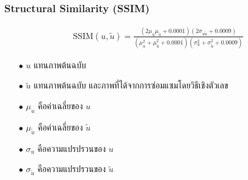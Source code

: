 \documentclass[xcolor=dvipsnames, xetex,serif]{beamer}
\numberwithin{equation}{section}
\begin{document}
    \begin{frame}
        \frametitle{Structural Similarity (SSIM)}
        \begin{align*}
        \text{SSIM}(u,\tilde{u}) = \frac{(2\mu_u\mu_{\tilde{u}} + 0.0001)(2\sigma_{u\tilde{u}} + 0.0009)}{(\mu_u^2+\mu_{\tilde{u}}^2+0.0001)(\sigma_u^2+\sigma_{\tilde{u}}^2+0.0009)}
        \end{align*}
        \begin{itemize}
            \item[$\bullet$] $u$ แทนภาพต้นฉบับ
            \item[$\bullet$] $\tilde{u}$  แทนภาพต้นฉบับ และภาพที่ได้จากการซ่อมแซมโดยวิธีเชิงตัวเลข
            \item[$\bullet$] $\mu_u$ คือค่าเฉลี่ยของ $u$
            \item[$\bullet$] $\mu_{\tilde{u}}$ คือค่าเฉลี่ยของ $\tilde{u}$
            \item[$\bullet$]  $\sigma_u$ คือความแปรปรวนของ $u$ 
            \item[$\bullet$] $\sigma_{\tilde{u}}$ คือความแปรปรวนของ $\tilde{u}$
        \end{itemize}
    \end{frame}
\end{document}
